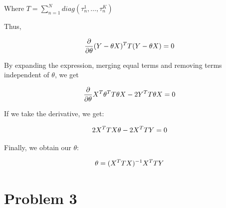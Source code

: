 \documentclass{article}
\begin{document}
\begin{enumerate}
Where $T = \sum_{n=1}^Ndiag(\tau_n^1,\dots,\tau_n^K)$

Thus,

\begin{equation*}
\frac{\partial}{\partial \theta} (Y-\theta X)^TT(Y-\theta X) = 0\\
\end{equation*}

By expanding the expression, merging equal terms and removing terms independent of $\theta$, we get

\begin{equation*}
\frac{\partial}{\partial \theta}  X^T\theta^TT\theta X - 2Y^TT\theta X = 0\\
\end{equation*}

If we take the derivative, we get:

\begin{equation*}
2X^TTX\theta - 2X^TTY = 0\\
\end{equation*}

Finally, we obtain our $\theta$:

\begin{equation*}
\theta = (X^TTX)^{-1}X^TTY\\
\end{equation*}

\end{enumerate}

\newpage

\section*{Problem 3}
\end{document}
